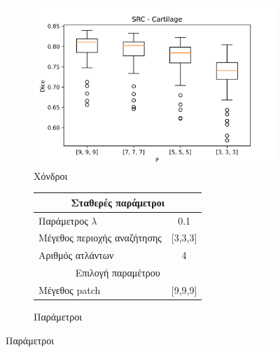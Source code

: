 \documentclass{beamer}
\begin{document}
\begin{frame}
\begin{figure}[H]
    \begin{subfigure}[b]{0.42\linewidth}
    \includegraphics[width=\linewidth]{SRC_P_Cartilage_plot.png}
    \caption{Χόνδροι}
    \end{subfigure}
    \begin{subfigure}[b]{0.42\linewidth}
        \begin{tabular}[t]{|l|c|} 
            \multicolumn{2}{c}{\footnotesize Σταθερές παράμετροι} \\
            \hline
            \footnotesize Παράμετρος $\lambda$ & \footnotesize 0.1 \\
            \hline
            \footnotesize Μέγεθος περιοχής αναζήτησης & \footnotesize  [3,3,3] \\ 
            \hline
            \footnotesize Αριθμός ατλάντων & \footnotesize 4 \\ 
            \hline
            \multicolumn{2}{c}{\footnotesize Επιλογή παραμέτρου} \\
            \hline
            \footnotesize Μέγεθος patch & \footnotesize [9,9,9] \\
            \hline
        \end{tabular}
    \caption{Παράμετροι}
    \end{subfigure}
\end{figure}

\end{frame}
\end{document}

